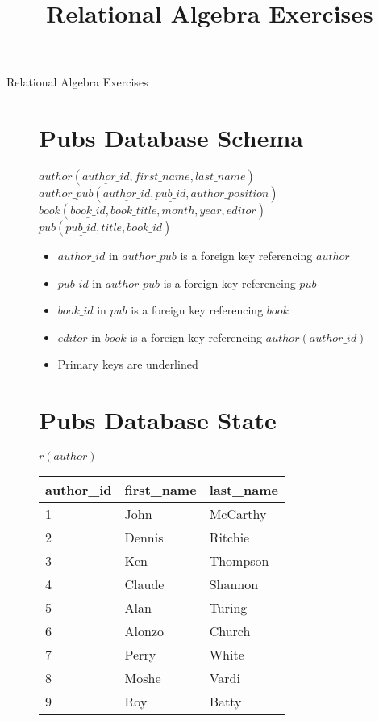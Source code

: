 \documentclass[answers]{exam}
\title{Relational Algebra Exercises}
\date{}
\begin{document}
\begin{center}
\LARGE{Relational Algebra Exercises}
\end{center}

\begin{figure}[H]

\section*{Pubs Database Schema}

$author(\underline{author\_id}, first\_name, last\_name)$\\

$author\_pub(\underline{author\_id}, \underline{pub\_id}, author\_position)$\\

$book(\underline{book\_id}, book\_title, month, year, editor)$\\

$pub(\underline{pub\_id}, title, book\_id)$

\begin{itemize}
\item $author\_id$ in $author\_pub$ is a foreign key referencing $author$
\item $pub\_id$ in $author\_pub$ is a foreign key referencing $pub$
\item $book\_id$ in $pub$ is a foreign key referencing $book$
\item $editor$ in $book$ is a foreign key referencing $author(author\_id)$
\item Primary keys are underlined
\end{itemize}

\section*{Pubs Database State}

\begin{multicols}{2}

$r(author)$\\
\begin{tabular}{|l|l|l|}\hline
\rowcolor{lightgray} author\_id & first\_name & last\_name \\\hline
1 & John       & McCarthy  \\\hline
2 & Dennis     & Ritchie   \\\hline
3 & Ken        & Thompson  \\\hline
4 & Claude     & Shannon   \\\hline
5 & Alan       & Turing    \\\hline
6 & Alonzo     & Church    \\\hline
7 & Perry      & White     \\\hline
8 & Moshe      & Vardi     \\\hline
9 & Roy        & Batty     \\\hline
\end{tabular}


\end{multicols}
\end{figure}
\end{document}
